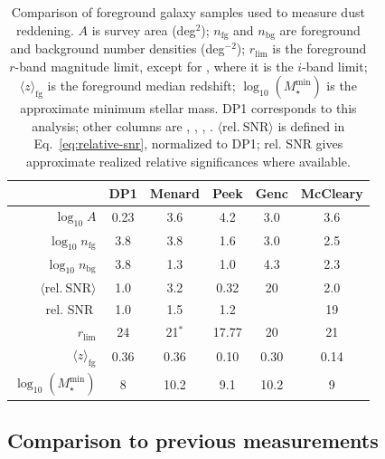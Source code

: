 \documentclass[linenumbers, twocolumn]{aastex701}
\begin{document}
\begin{table}[t]
    \centering
    \caption{
        Comparison of foreground galaxy samples used to measure dust reddening.
        $A$ is survey area (deg$^2$);
        $n_\mathrm{fg}$ and $n_\mathrm{bg}$ are foreground and background number densities (deg$^{-2}$);
        $r_\mathrm{lim}$ is the foreground $r$-band magnitude limit, except for \citet{menard2010}, where it is the $i$-band limit;
        $\langle z \rangle_\mathrm{fg}$ is the foreground median redshift;
        $\log_{10}(M_\star^\mathrm{min})$ is the approximate minimum stellar mass.
        DP1 corresponds to this analysis;
        other columns are \citet{menard2010}, \citet{peek2015}, \citet{genc2025}, \citet{mccleary2025}.
        $\langle \mathrm{rel.~SNR}\rangle$ is defined in Eq.~\ref{eq:relative-snr}, normalized to DP1;
        rel. SNR gives approximate realized relative significances where available.
        \label{tab:sample-comparison}
    }
    \begin{tabular}{rccccc}
        \hline\hline
                                              &  DP1 &       Menard &  Peek & Genc & McCleary \\
        \hline
        $\log_{10}A$                          &  0.23 &         3.6 &   4.2 &  3.0 & 3.6 \\
        $\log_{10} n_\mathrm{fg}$             &  3.8 &          3.8 &   1.6 &  3.0 & 2.5 \\
        $\log_{10} n_\mathrm{bg}$             &  3.8 &          1.3 &   1.0 &  4.3 & 2.3 \\
        $\langle \mathrm{rel.~SNR} \rangle$   &  1.0 &          3.2 &  0.32 &   20 & 2.0 \\
        rel. SNR$~$                           &  1.0 &          1.5 &   1.2 &      & 19 \\
        $r_\mathrm{lim}$                      &   24 &   21$^{\!*}$ & 17.77 &   20 & 21 \\
        $\langle z \rangle_\mathrm{fg}$       & 0.36 &         0.36 &  0.10 & 0.30 & 0.14 \\
        $\log_{10}(M_\star^\mathrm{min})$     &    8 &         10.2 &   9.1 & 10.2 & 9 \\
        \hline
    \end{tabular}
\end{table}

\subsection{Comparison to previous measurements}
\end{document}
